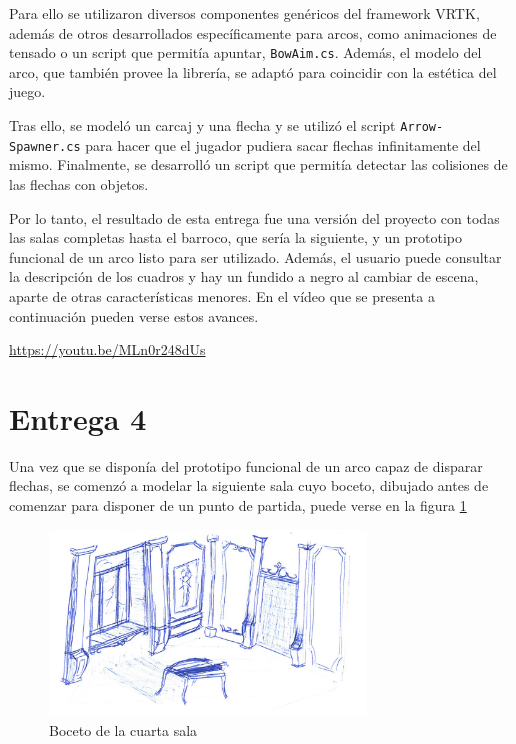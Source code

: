 Para ello se utilizaron diversos componentes genéricos del framework \acs{VRTK}, además de otros desarrollados específicamente para arcos, como animaciones de tensado o un script que permitía apuntar, \texttt{BowAim.cs}. Además, el modelo del arco, que también provee la librería, se adaptó para coincidir con la estética del juego.

Tras ello, se modeló un carcaj y una flecha y se utilizó el script \texttt{Arrow-} \texttt{Spawner.cs} para hacer que el jugador pudiera sacar flechas infinitamente del mismo. Finalmente, se desarrolló un script que permitía detectar las colisiones de las flechas con objetos.

Por lo tanto, el resultado de esta entrega fue una versión del proyecto con todas las salas completas hasta el barroco, que sería la siguiente, y un prototipo funcional de un arco listo para ser utilizado. Además, el usuario puede consultar la descripción de los cuadros y hay un fundido a negro al cambiar de escena, aparte de otras características menores. En el vídeo que se presenta a continuación pueden verse estos avances.

\begin{center}
    \url{https://youtu.be/MLn0r248dUs}
\end{center}



\section{Entrega 4}

Una vez que se disponía del prototipo funcional de un arco capaz de disparar flechas, se comenzó a modelar la siguiente sala cuyo boceto, dibujado antes de comenzar para disponer de un punto de partida, puede verse en la figura \ref{fig:boceto-sala-4}

\begin{figure}[!h]
\begin{center}
\includegraphics[width=0.75\textwidth]{imagenes/7/bocetos/boceto-sala-4.png}
\caption{Boceto de la cuarta sala}
\label{fig:boceto-sala-4}
\end{center}
\end{figure}

